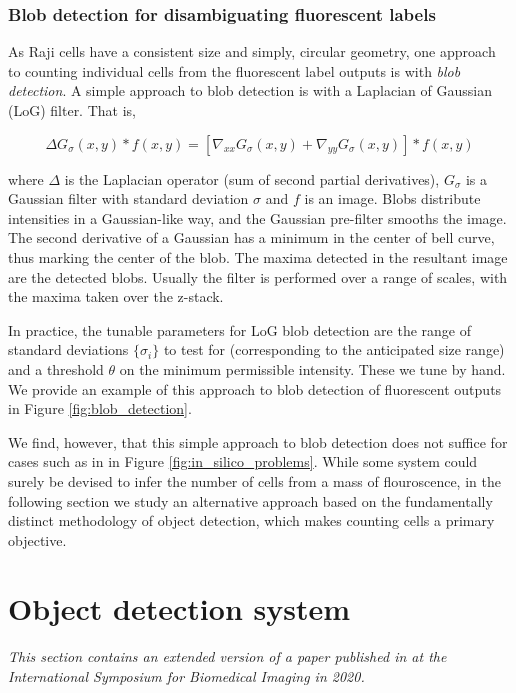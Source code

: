 \subsubsection{Blob detection for disambiguating fluorescent labels}

As Raji cells have a consistent size and simply, circular geometry, one approach to counting individual cells from the fluorescent label outputs is with \emph{blob detection}. A simple approach to blob detection is with a Laplacian of Gaussian (LoG) filter. That is,

$$\Delta G_\sigma(x, y) * f(x, y) = [\nabla_{xx}G_\sigma(x, y) + \nabla_{yy}G_\sigma(x, y)] * f(x, y)$$

where $\Delta$ is the Laplacian operator (sum of second partial derivatives), $G_\sigma$ is a Gaussian filter with standard deviation $\sigma$ and $f$ is an image. Blobs distribute intensities in a Gaussian-like way, and the Gaussian pre-filter smooths the image. The second derivative of a Gaussian has a minimum in the center of bell curve, thus marking the center of the blob. The maxima detected in the resultant image are the detected blobs. Usually the filter is performed over a range of scales, with the maxima taken over the z-stack.

In practice, the tunable parameters for LoG blob detection are the range of standard deviations $\{\sigma_i\}$ to test for (corresponding to the anticipated size range) and a threshold $\theta$ on the minimum permissible intensity. These we tune by hand. We provide an example of this approach to blob detection of fluorescent outputs in Figure \ref{fig:blob_detection}.

We find, however, that this simple approach to blob detection does not suffice for cases such as in in Figure \ref{fig:in_silico_problems}. While some system could surely be devised to infer the number of cells from a mass of flouroscence, in the following section we study an alternative approach based on the fundamentally distinct methodology of object detection, which makes counting cells a primary objective.

\section{Object detection system}
\label{sec:object_detection_system}

\emph{This section contains an extended version of a paper published in at the International Symposium for Biomedical Imaging in 2020.}

